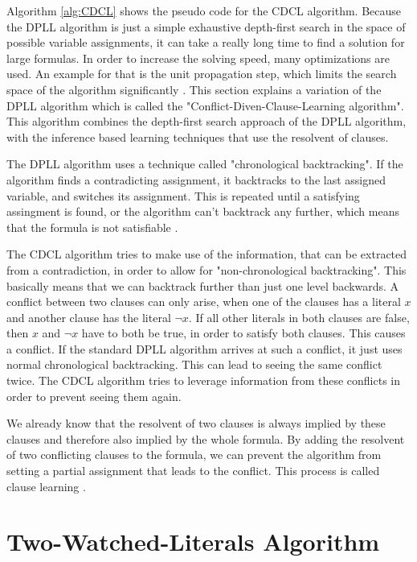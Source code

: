 Algorithm \ref{alg:CDCL} \cite{biere2009handbook} shows the pseudo code for the CDCL algorithm. Because the DPLL algorithm is just a simple exhaustive depth-first search in the space of possible variable assignments, it can take a really long time to find a solution for large formulas. In order to increase the solving speed, many optimizations are used. An example for that is the unit propagation step, which limits the search space of the algorithm significantly \cite{biere2009handbook}. This section explains a variation of the DPLL algorithm which is called the "Conflict-Diven-Clause-Learning algorithm". This algorithm combines the depth-first search approach of the DPLL algorithm, with the inference based learning techniques that use the resolvent of clauses. \cite{biere2009handbook}

The DPLL algorithm uses a technique called "chronological backtracking". If the algorithm finds a contradicting assignment, it backtracks to the last assigned variable, and switches its assignment. This is repeated until a satisfying assingment is found, or the algorithm can't backtrack any further, which means that the formula is not satisfiable \cite{biere2009handbook}.

The CDCL algorithm tries to make use of the information, that can be extracted from a contradiction, in order to allow for "non-chronological backtracking". This basically means that we can backtrack further than just one level backwards. \cite{biere2009handbook}
A conflict between two clauses can only arise, when one of the clauses has a literal $x$ and another clause has the literal $\neg x$. If all other literals in both clauses are false, then $x$ and $\neg x$ have to both be true, in order to satisfy both clauses. This causes a conflict.
If the standard DPLL algorithm arrives at such a conflict, it just uses normal chronological backtracking. This can lead to seeing the same conflict twice. The CDCL algorithm tries to leverage information from these conflicts in order to prevent seeing them again.

We already know that the resolvent of two clauses is always implied by these clauses and therefore also implied by the whole formula. By adding the resolvent of two conflicting clauses to the formula, we can prevent the algorithm from setting a partial assignment that leads to the conflict. This process is called clause learning \cite{biere2009handbook}.

\section{Two-Watched-Literals Algorithm}
\label{sec:twoWatchedLiterals}

